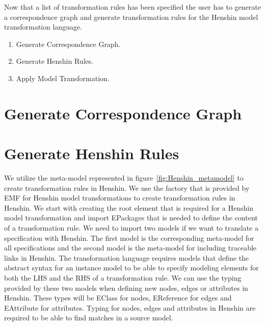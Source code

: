 Now that a list of transformation rules has been specified the user has to
generate a correspondence graph and generate transformation rules for the
Henshin model transformation language. 

\begin{enumerate}

\item Generate Correspondence Graph.

\item Generate Henshin Rules.

\item Apply Model Transformation. 

\end{enumerate}


\section{Generate Correspondence Graph}

\section{Generate Henshin Rules}

We utilize the meta-model represented in figure~\ref{fig:Henshin_metamodel} to
create transformation rules in Henshin.  We use the factory that is provided by
EMF for Henshin model transformations to create transformation rules in Henshin.
We start with creating the root element that is required for a Henshin model
transformation and import EPackages that is needed to define the content of a
transformation rule. We need to import two models if we want to translate a
specification with Henshin. The first model is the corresponding meta-model for
all specifications and the second model is the meta-model for including
traceable links in Henshin. The transformation language requires models that
define the abstract syntax for an instance model to be able to specify modeling
elements for both the LHS and the RHS of a transformation rule. We can use
the typing provided by these two models when defining new nodes, edges or
attributes in Henshin. These types will be EClass for nodes, EReference for
edges and EAttribute for attributes. Typing for nodes, edges and attributes in
Henshin are required to be able to find matches in a source model. 

